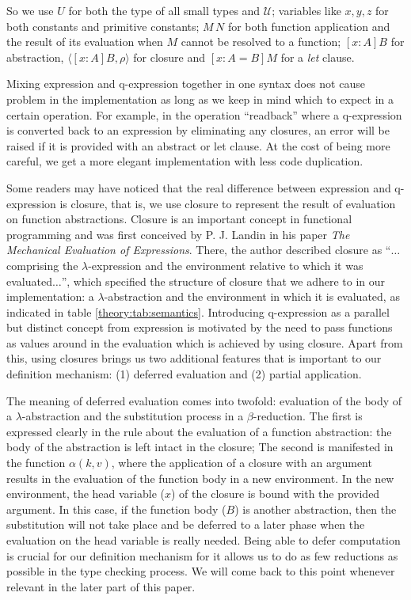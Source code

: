 So we use $U$ for both the type of all small types and $\mathcal{U}$; variables like $x,y,z$ for both constants and primitive constants; $M\,N$ for both function application and the result of its evaluation when $M$ cannot be resolved to a function; $[x : A] B$ for abstraction, $\langle[x : A] B, \rho\rangle$ for closure and $[x : A = B] M$ for a \emph{let} clause.

Mixing expression and q-expression together in one syntax does not cause problem in the implementation as long as we keep in mind which to expect in a certain operation. For example, in the operation ``readback'' where a q-expression is converted back to an expression by eliminating any closures, an error will be raised if it is provided with an abstract or let clause. At the cost of being more careful, we get a more elegant implementation with less code duplication.

Some readers may have noticed that the real difference between expression and q-expression is closure, that is, we use closure to represent the result of evaluation on function abstractions. Closure is an important concept in functional programming and was first conceived by P. J. Landin in his paper \emph{The Mechanical Evaluation of Expressions}\cite{landin1964mechanical}. There, the author described closure as ``$\dots$comprising the $\lambda$-expression and the environment relative to which it was evaluated$\dots$'', which specified the structure of closure that we adhere to in our implementation: a $\lambda$-abstraction and the environment in which it is evaluated, as indicated in table \ref{theory:tab:semantics}. Introducing q-expression as a parallel but distinct concept from expression is motivated by the need to pass functions as values around in the evaluation which is achieved by using closure. Apart from this, using closures brings us two additional features that is important to our definition mechanism: (1) deferred evaluation and (2) partial application.

The meaning of deferred evaluation comes into twofold: evaluation of the body of a $\lambda$-abstraction and the substitution process in a $\beta$-reduction. The first is expressed clearly in the rule about the evaluation of a function abstraction: the body of the abstraction is left intact in the closure; The second is manifested in the function $\alpha(k,v)$, where the application of a closure with an argument results in the evaluation of the function body in a new environment. In the new environment, the head variable ($x$) of the closure is bound with the provided argument. In this case, if the function body ($B$) is another abstraction, then the substitution will not take place and be deferred to a later phase when the evaluation on the head variable is really needed. Being able to defer computation is crucial for our definition mechanism for it allows us to do as few reductions as possible in the type checking process. We will come back to this point whenever relevant in the later part of this paper.

